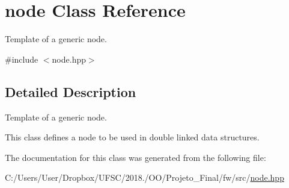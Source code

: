 \hypertarget{classnode}{}\section{node Class Reference}
\label{classnode}


Template of a generic node.  




{\ttfamily \#include $<$node.\+hpp$>$}



\subsection{Detailed Description}
Template of a generic node. 

This class defines a node to be used in double linked data structures. 

The documentation for this class was generated from the following file\+:\begin{DoxyCompactItemize}
\item 
C\+:/\+Users/\+User/\+Dropbox/\+U\+F\+S\+C/2018./\+O\+O/\+Projeto\+\_\+\+Final/fw/src/\mbox{\hyperlink{node_8hpp}{node.\+hpp}}\end{DoxyCompactItemize}
